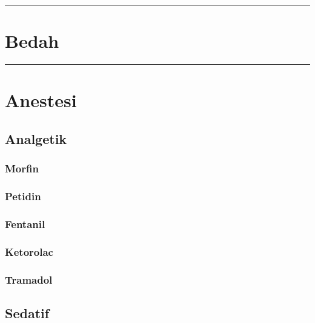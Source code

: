 \documentclass[
]{book}
\begin{document}
\begin{center}\rule{0.5\linewidth}{0.5pt}\end{center}

\hypertarget{bedah-1}{%
\section{Bedah}\label{bedah-1}}

\begin{center}\rule{0.5\linewidth}{0.5pt}\end{center}

\hypertarget{anestesi-2}{%
\section{Anestesi}\label{anestesi-2}}

\hypertarget{analgetik}{%
\subsection{Analgetik}\label{analgetik}}

\hypertarget{morfin}{%
\subsubsection{Morfin}\label{morfin}}

\hypertarget{petidin}{%
\subsubsection{Petidin}\label{petidin}}

\hypertarget{fentanil-1}{%
\subsubsection{Fentanil}\label{fentanil-1}}

\hypertarget{ketorolac-1}{%
\subsubsection{Ketorolac}\label{ketorolac-1}}

\hypertarget{tramadol}{%
\subsubsection{Tramadol}\label{tramadol}}

\hypertarget{sedatif}{%
\subsection{Sedatif}\label{sedatif}}
\end{document}
